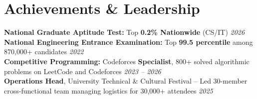 \documentclass[10pt]{article}
\begin{document}
\section*{Achievements \& Leadership}
\textbf{National Graduate Aptitude Test:} Top \textbf{0.2\% Nationwide} (CS/IT) \hfill \textit{2026} \\[0.1em]
\textbf{National Engineering Entrance Examination:} Top \textbf{99.5 percentile} among 870,000+ candidates \hfill \textit{2022} \\[0.1em]
\textbf{Competitive Programming:} Codeforces \textbf{Specialist}, 800+ solved algorithmic problems on LeetCode and Codeforces \hfill \textit{2023 -- 2026} \\[0.1em]
\textbf{Operations Head}, University Technical & Cultural Festival -- Led 30-member cross-functional team managing logistics for 30,000+ attendees \hfill \textit{2025}
\end{document}
